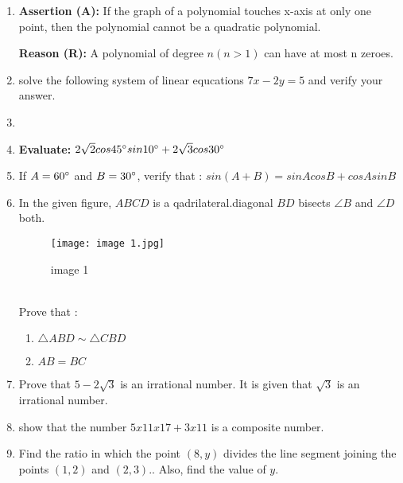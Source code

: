 \documentclass{article}
\providecommand{\brak}[1]{\ensuremath{\left(#1\right)}}
\begin{document}
\begin{enumerate}
\item \textbf{Assertion (A):} If the graph of a polynomial touches x-axis at only one point, then the polynomial cannot be a quadratic polynomial.

	\textbf{Reason (R):} A polynomial of degree $n\brak{n > 1}$ can have at most n zeroes.
\item solve the following system of linear equcations $7x-2y=5$ and verify your answer.
\item{}

\item\textbf{ Evaluate:} $2\sqrt{2} cos 45\degree sin 10\degree + 2\sqrt{3} cos 30\degree$

\item If  $A = 60\degree$ and  $B = 30\degree$, verify that : $sin\brak{A + B} = sin A cos B + cos A sin B$
\newpage
\item In  the given figure, $ABCD$ is a qadrilateral.diagonal $BD$ bisects $\angle B$ and $\angle D$ both. 
\begin{figure}[!ht]
\centering
\texttt{[image: image 1.jpg]}
\label{fig:image 1}
\caption{image 1}
\end{figure}\\
\text Prove that :\\	
\begin{enumerate}	
\item$\triangle ABD \sim \triangle CBD $\\
\item $AB = BC$
\end{enumerate}
\item Prove that $ 5 - 2\sqrt{3}$ is an irrational number. It is given that $\sqrt{3}$  is an irrational number.

\item show that the number $5x11x17+3x11$ is a composite number.
\item Find the ratio in which the point $\brak{8, y}$ divides the line segment joining the points $\brak{1, 2}$ and $\brak{2, 3}$.. Also, find the value of  $y$.


\end{enumerate}
\end{document}

